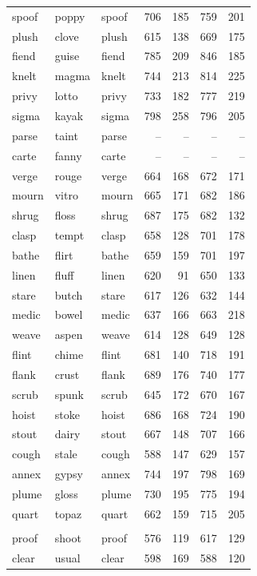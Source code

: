 \documentclass[
]{interact}
\begin{document}
\begin{longtable*}{lllrrrr}
spoof & poppy & spoof & 706 & 185 & 759 & 201 \\ 
plush & clove & plush & 615 & 138 & 669 & 175 \\ 
fiend & guise & fiend & 785 & 209 & 846 & 185 \\ 
knelt & magma & knelt & 744 & 213 & 814 & 225 \\ 
privy & lotto & privy & 733 & 182 & 777 & 219 \\ 
sigma & kayak & sigma & 798 & 258 & 796 & 205 \\ 
parse & taint & parse & – & – & – & – \\ 
carte & fanny & carte & – & – & – & – \\ 
verge & rouge & verge & 664 & 168 & 672 & 171 \\ 
mourn & vitro & mourn & 665 & 171 & 682 & 186 \\ 
shrug & floss & shrug & 687 & 175 & 682 & 132 \\ 
clasp & tempt & clasp & 658 & 128 & 701 & 178 \\ 
bathe & flirt & bathe & 659 & 159 & 701 & 197 \\ 
linen & fluff & linen & 620 & 91 & 650 & 133 \\ 
stare & butch & stare & 617 & 126 & 632 & 144 \\ 
medic & bowel & medic & 637 & 166 & 663 & 218 \\ 
weave & aspen & weave & 614 & 128 & 649 & 128 \\ 
flint & chime & flint & 681 & 140 & 718 & 191 \\ 
flank & crust & flank & 689 & 176 & 740 & 177 \\ 
scrub & spunk & scrub & 645 & 172 & 670 & 167 \\ 
hoist & stoke & hoist & 686 & 168 & 724 & 190 \\ 
stout & dairy & stout & 667 & 148 & 707 & 166 \\ 
cough & stale & cough & 588 & 147 & 629 & 157 \\ 
annex & gypsy & annex & 744 & 197 & 798 & 169 \\ 
plume & gloss & plume & 730 & 195 & 775 & 194 \\ 
quart & topaz & quart & 662 & 159 & 715 & 205 \\ 
\midrule\addlinespace[2.5pt]
 \\ 
\midrule\addlinespace[2.5pt]
proof & shoot & proof & 576 & 119 & 617 & 129 \\ 
clear & usual & clear & 598 & 169 & 588 & 120 \\ 

\end{longtable*}
\end{document}
